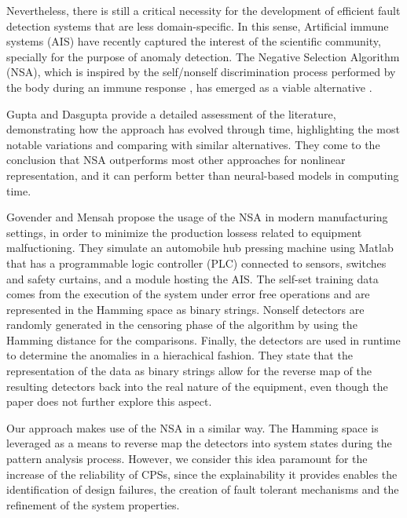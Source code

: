 Nevertheless, there is still a critical necessity for the development of efficient fault detection systems that are less domain-specific. In this sense, Artificial immune systems (AIS) have recently captured the interest of the scientific community, specially for the purpose of anomaly detection. The Negative Selection Algorithm (NSA), which is inspired by the self/nonself discrimination process performed by the body during an immune response \cite{Kuby2019}, has emerged as a viable alternative \cite{abid2020improved}.

Gupta and Dasgupta \cite{NSAResearch2021} provide a detailed assessment of the literature, demonstrating how the approach has evolved through time, highlighting the most notable variations and comparing with similar alternatives. They come to the conclusion that NSA outperforms most other approaches for nonlinear representation, and it can perform better than neural-based models in computing time.  

Govender and Mensah \cite{govender2010fault} propose the usage of the NSA in modern manufacturing settings, in order to minimize the production lossess related to equipment malfuctioning. They simulate an automobile hub pressing machine using Matlab that has a programmable logic controller (PLC) connected to sensors, switches and safety curtains, and a module hosting the AIS. The self-set training data comes from the execution of the system under error free operations and are represented in the Hamming space as binary strings. Nonself detectors are randomly generated in the censoring phase of the algorithm by using the Hamming distance for the comparisons. Finally, the detectors are used in runtime to determine the anomalies in a hierachical fashion. They state that the representation of the data as binary strings allow for the reverse map of the resulting detectors back into the real nature of the equipment, even though the paper does not further explore this aspect.

Our approach makes use of the NSA in a similar way. The Hamming space is leveraged as a means to reverse map the detectors into system states during the pattern analysis process. However, we consider this idea paramount for the increase of the reliability of CPSs, since the explainability it provides enables the identification of design failures, the creation of fault tolerant mechanisms and the refinement of the system properties.

